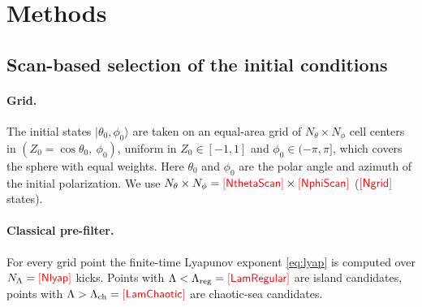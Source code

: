 \documentclass[aps,pra,twocolumn,superscriptaddress,nofootinbib]{revtex4-2}
\newcommand{\PH}[1]{\textcolor{red}{[\textsf{#1}]}}
\newcommand{\num}[1]{\ifcsname Num#1\endcsname\csname Num#1\endcsname\else\PH{#1}\fi}
\newcommand{\thz}{\theta_0}                %
\newcommand{\phz}{\phi_0}                  %
\begin{document}
\section{Methods}\label{sec:methods}

\subsection{Scan-based selection of the initial conditions}\label{sec:scan}

\paragraph{Grid.}
The initial states $|\thz,\phz\rangle$ are taken on an equal-area grid of $N_\theta\times N_\phi$ cell centers in
$(Z_0=\cos\thz,\ \phz)$, uniform in $Z_0\in[-1,1]$ and $\phz\in(-\pi,\pi]$, which covers the sphere with equal
weights. Here $\thz$ and $\phz$ are the polar angle and azimuth of the initial polarization. We use
$N_\theta\times N_\phi=\num{NthetaScan}\times\num{NphiScan}$ ($\num{Ngrid}$ states).

\paragraph{Classical pre-filter.}
For every grid point the finite-time Lyapunov exponent \cref{eq:lyap} is computed over $N_\Lambda=\num{Nlyap}$
kicks. Points with $\Lambda<\Lambda_{\rm reg}=\num{LamRegular}$ are island candidates, points with
$\Lambda>\Lambda_{\rm ch}=\num{LamChaotic}$ are chaotic-sea candidates.
\end{document}

